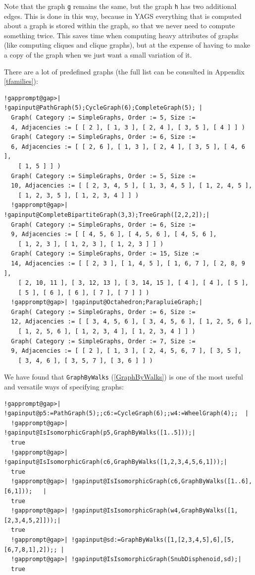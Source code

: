 \documentclass[a4paper,11pt]{report}
\begin{document}
{{Note that the graph \texttt{g} remains the same, but the graph \texttt{h} has two additional edges. This is done in this way, because in \textsf{YAGS} everything that is computed about a graph is stored within the graph, so that
we never need to compute something twice. This saves time when computing heavy
attributes of graphs (like computing cliques and clique graphs), but at the
expense of having to make a copy of the graph when we just want a small
variation of it. 

 There are a lot of predefined graphs (the full list can be consulted in
Appendix \ref{tfamilies}): 

 
\begin{Verbatim}[commandchars=!@|,fontsize=\small,frame=single,label=Example]
  !gapprompt@gap>| !gapinput@PathGraph(5);CycleGraph(6);CompleteGraph(5); |
  Graph( Category := SimpleGraphs, Order := 5, Size := 
  4, Adjacencies := [ [ 2 ], [ 1, 3 ], [ 2, 4 ], [ 3, 5 ], [ 4 ] ] )
  Graph( Category := SimpleGraphs, Order := 6, Size := 
  6, Adjacencies := [ [ 2, 6 ], [ 1, 3 ], [ 2, 4 ], [ 3, 5 ], [ 4, 6 ], 
    [ 1, 5 ] ] )
  Graph( Category := SimpleGraphs, Order := 5, Size := 
  10, Adjacencies := [ [ 2, 3, 4, 5 ], [ 1, 3, 4, 5 ], [ 1, 2, 4, 5 ], 
    [ 1, 2, 3, 5 ], [ 1, 2, 3, 4 ] ] )
  !gapprompt@gap>| !gapinput@CompleteBipartiteGraph(3,3);TreeGraph([2,2,2]);|
  Graph( Category := SimpleGraphs, Order := 6, Size := 
  9, Adjacencies := [ [ 4, 5, 6 ], [ 4, 5, 6 ], [ 4, 5, 6 ], 
    [ 1, 2, 3 ], [ 1, 2, 3 ], [ 1, 2, 3 ] ] )
  Graph( Category := SimpleGraphs, Order := 15, Size := 
  14, Adjacencies := [ [ 2, 3 ], [ 1, 4, 5 ], [ 1, 6, 7 ], [ 2, 8, 9 ], 
    [ 2, 10, 11 ], [ 3, 12, 13 ], [ 3, 14, 15 ], [ 4 ], [ 4 ], [ 5 ], 
    [ 5 ], [ 6 ], [ 6 ], [ 7 ], [ 7 ] ] )
  !gapprompt@gap>| !gapinput@Octahedron;ParapluieGraph;|
  Graph( Category := SimpleGraphs, Order := 6, Size := 
  12, Adjacencies := [ [ 3, 4, 5, 6 ], [ 3, 4, 5, 6 ], [ 1, 2, 5, 6 ], 
    [ 1, 2, 5, 6 ], [ 1, 2, 3, 4 ], [ 1, 2, 3, 4 ] ] )
  Graph( Category := SimpleGraphs, Order := 7, Size := 
  9, Adjacencies := [ [ 2 ], [ 1, 3 ], [ 2, 4, 5, 6, 7 ], [ 3, 5 ], 
    [ 3, 4, 6 ], [ 3, 5, 7 ], [ 3, 6 ] ] )
\end{Verbatim}
 

We have found that \texttt{GraphByWalks} (\ref{GraphByWalks}) is one of the most useful and versatile ways of specifying graphs: 

 
\begin{Verbatim}[commandchars=!@|,fontsize=\small,frame=single,label=Example]
  !gapprompt@gap>| !gapinput@p5:=PathGraph(5);;c6:=CycleGraph(6);;w4:=WheelGraph(4);;  |
  !gapprompt@gap>| !gapinput@IsIsomorphicGraph(p5,GraphByWalks([1..5]));|
  true
  !gapprompt@gap>| !gapinput@IsIsomorphicGraph(c6,GraphByWalks([1,2,3,4,5,6,1]));|
  true
  !gapprompt@gap>| !gapinput@IsIsomorphicGraph(c6,GraphByWalks([1..6],[6,1]));   |
  true
  !gapprompt@gap>| !gapinput@IsIsomorphicGraph(w4,GraphByWalks([1,[2,3,4,5,2]]));|
  true
  !gapprompt@gap>| !gapinput@sd:=GraphByWalks([1,[2,3,4,5],6],[5,[6,7,8,1],2]);; |
  !gapprompt@gap>| !gapinput@IsIsomorphicGraph(SnubDisphenoid,sd);|
  true
\end{Verbatim}
 

}}
\end{document}
